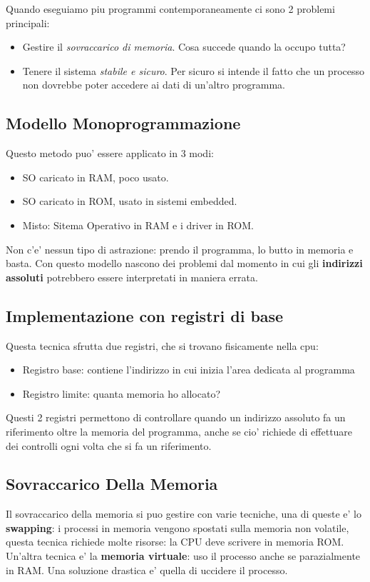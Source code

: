 Quando eseguiamo piu programmi contemporaneamente ci sono 2 problemi principali:
\begin{itemize}
    \item Gestire il \textit{sovraccarico di memoria}. Cosa succede quando la occupo tutta?
    \item Tenere il sistema \textit{stabile e sicuro}. Per sicuro si intende il fatto che un processo non
    dovrebbe poter accedere ai dati di un'altro programma.
\end{itemize}

\subsection{Modello Monoprogrammazione}
Questo metodo puo' essere applicato in 3 modi:
\begin{itemize}
    \item SO caricato in RAM, poco usato.
    \item SO caricato in ROM, usato in sistemi embedded.
    \item Misto: Sitema Operativo in RAM e i driver in ROM.
\end{itemize}

Non c'e' nessun tipo di astrazione: prendo il programma, lo butto in memoria e basta.
Con questo modello nascono dei problemi dal momento in cui gli 
\textbf{indirizzi assoluti} potrebbero essere interpretati in maniera errata.


\subsection{Implementazione con registri di base}
Questa tecnica sfrutta due registri, che si trovano fisicamente nella cpu:
\begin{itemize}
    \item Registro base: contiene l'indirizzo in cui inizia l'area dedicata al programma
    \item Registro limite: quanta memoria ho allocato?
\end{itemize}

Questi 2 registri permettono di controllare quando un indirizzo assoluto fa 
un riferimento oltre la memoria del programma, anche se cio' richiede di effettuare dei
controlli ogni volta che si fa un riferimento.

\subsection{Sovraccarico Della Memoria}
Il sovraccarico della memoria si puo gestire con varie tecniche, una di queste e' lo
\textbf{swapping}: i processi in memoria vengono spostati sulla memoria non volatile, questa tecnica
richiede molte risorse: la CPU deve scrivere in memoria ROM.
Un'altra tecnica e' la \textbf{memoria virtuale}: uso il processo anche se parazialmente in RAM.
Una soluzione drastica e' quella di uccidere il processo.

